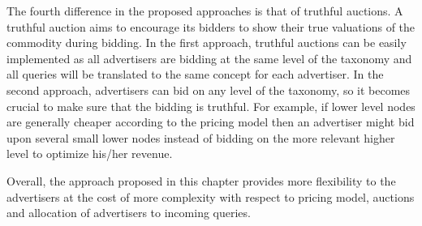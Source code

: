 The fourth difference in the proposed approaches is that of truthful auctions. A truthful auction aims to encourage its bidders to show their true valuations of the commodity during bidding. In the first approach, truthful auctions can be easily implemented as all advertisers are bidding at the same level of the taxonomy and all queries will be translated to the same concept for each advertiser. In the second approach, advertisers can bid on any level of the taxonomy, so it becomes crucial to make sure that the bidding is truthful. For example, if lower level nodes are generally cheaper according to the pricing model then an advertiser might bid upon several small lower nodes instead of bidding on the more relevant higher level to optimize his/her revenue.


Overall, the approach proposed in this chapter provides more flexibility to the advertisers at the cost of more complexity with respect to pricing model, auctions and allocation of advertisers to incoming queries.

